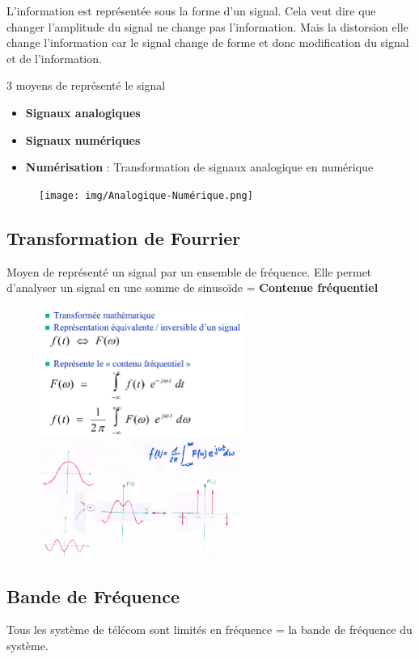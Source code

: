	
	L'information est représentée sous la forme d'un signal. Cela veut dire que changer l'amplitude du signal ne change pas l'information. Mais la distorsion elle change l'information car le signal change de forme et donc modification du signal et de l'information.
	
	3 moyens de représenté le signal
	\begin{itemize}
		\item \textbf{Signaux analogiques}
		\item \textbf{Signaux numériques}
		\item \textbf{Numérisation} : Transformation de signaux analogique en numérique
	\end{itemize}
		\begin{figure}[H]
			\centering
			\texttt{[image: img/Analogique-Numérique.png]}
		\end{figure}
		
	\subsection{Transformation de Fourrier}
		Moyen de représenté un signal par un ensemble de fréquence. Elle permet d'analyser un signal en une somme de sinusoïde = \textbf{Contenue fréquentiel}
		\begin{figure}[H]
			\centering
			\includegraphics[width=0.6\textwidth]{img/Fourrier.png}
			\includegraphics[width=0.6\textwidth]{img/FourrierExemple.png}
		\end{figure}
		
	\subsection{Bande de Fréquence}
		Tous les système de télécom sont limités en fréquence = la bande de fréquence du système.
		

